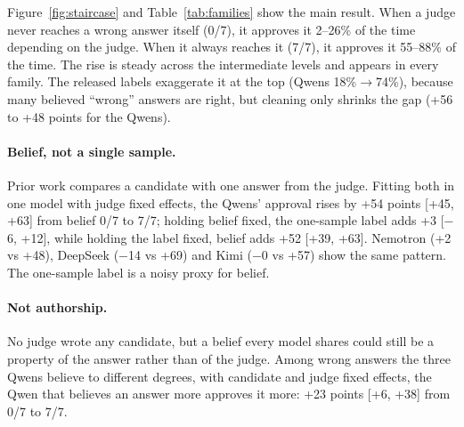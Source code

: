 \documentclass[11pt]{article}
\begin{document}
Figure~\ref{fig:staircase} and Table~\ref{tab:families} show the main result. When a judge never reaches a wrong
answer itself (0/7), it approves it 2--26\% of the time depending on the judge. When it always reaches it (7/7), it
approves it 55--88\% of the time. The rise is steady across the intermediate levels and appears in every family.
The released labels exaggerate it at the top (Qwens 18\%$\rightarrow$74\%), because many believed ``wrong'' answers
are right, but cleaning only shrinks the gap (+56 to +48 points for the Qwens).

\begin{table}[t]
\centering
\small
\setlength{\tabcolsep}{4pt}
\caption{Wrong answers approved (\%), by belief, audited labels. Gap: 7/7 minus 0/7 in points, with a 95\% interval
resampling answers. At 7/7 the groups hold 40, 17, 20 and 17 answers.}
\label{tab:families}
\end{table}

\paragraph{Belief, not a single sample.}
Prior work compares a candidate with one answer from the judge. Fitting both in one model with judge fixed effects,
the Qwens' approval rises by +54 points [+45, +63] from belief 0/7 to 7/7; holding belief fixed, the one-sample
label adds +3 [$-$6, +12], while holding the label fixed, belief adds +52 [+39, +63]. Nemotron (+2 vs +48),
DeepSeek ($-$14 vs +69) and Kimi ($-$0 vs +57) show the same pattern. The one-sample label is a noisy proxy for belief.

\paragraph{Not authorship.}
No judge wrote any candidate, but a belief every model shares could still be a property of the answer rather than of
the judge. Among wrong answers the three Qwens believe to different degrees, with candidate and judge fixed effects,
the Qwen that believes an answer more approves it more: +23 points [+6, +38] from 0/7 to 7/7.
\end{document}
